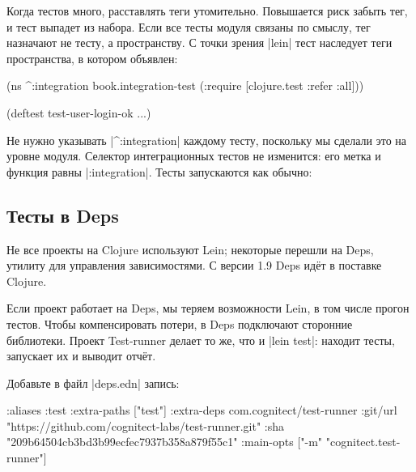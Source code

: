 Когда тестов много, расставлять теги утомительно. Повышается риск забыть тег, и
тест выпадет из набора. Если все тесты модуля связаны по смыслу, тег назначают
не тесту, а пространству. С точки зрения \spverb|lein| тест наследует теги
пространства, в котором объявлен:

\begin{english}
  \begin{clojure}
(ns ^:integration
  book.integration-test
  (:require [clojure.test :refer :all]))

(deftest test-user-login-ok
  ...)
  \end{clojure}
\end{english}

Не нужно указывать \spverb|^:integration| каждому тесту, поскольку мы сделали
это на уровне модуля. Селектор интеграционных тестов не изменится: его метка и
функция равны \spverb|:integration|. Тесты запускаются как обычно:

\begin{english}
\end{english}

\subsection{Тесты в Deps}


Не все проекты на Clojure используют Lein; некоторые перешли на
Deps, утилиту для управления
зависимостями. С версии 1.9 Deps идёт в поставке Clojure.


Если проект работает на Deps, мы теряем возможности Lein, в том числе прогон
тестов. Чтобы компенсировать потери, в Deps подключают сторонние
библиотеки. Проект Test-runner
делает то же, что и \spverb|lein test|: находит тесты, запускает их и выводит
отчёт.

Добавьте в файл \spverb|deps.edn| запись:

\begin{english}
  \begin{clojure}
:aliases
{:test
 {:extra-paths ["test"]
  :extra-deps
  {com.cognitect/test-runner
   {:git/url "https://github.com/cognitect-labs/test-runner.git"
    :sha "209b64504cb3bd3b99ecfec7937b358a879f55c1"}}
  :main-opts ["-m" "cognitect.test-runner"]}}
  \end{clojure}
\end{english}

